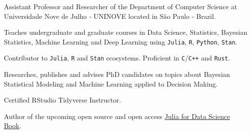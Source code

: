 \vspace{0.25cm}

\begin{cvitems}

  \item Assistant Professor and Researcher of the Department of Computer Science at Universidade Nove de Julho ‑
  UNINOVE located in São Paulo ‑ Brazil.
  \item Teaches undergraduate and graduate courses in Data Science, Statistics, Bayesian Statistics,
  Machine Learning and Deep Learning using \texttt{Julia}, \texttt{R}, \texttt{Python}, \texttt{Stan}.
  \item Contributor to \texttt{Julia}, \texttt{R} and \texttt{Stan} ecosystems. Proficient in \texttt{C}/\texttt{C++} and \texttt{Rust}.
  \item Researches, publishes and advises PhD candidates on topics about Bayesian Statistical Modeling and Machine
  Learning applied to Decision Making.
  \item Certified RStudio Tidyverse Instructor.
  \item Author of the upcoming open source and open access \href{https://juliadatascience.io}{Julia for Data Science Book}.

\end{cvitems}
